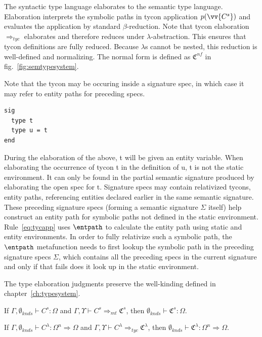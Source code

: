 The syntactic type language elaborates to the semantic type language. Elaboration interprets the symbolic paths in tycon application $p(\vv{C^s})$ and evaluates the application by standard $\beta$-reduction. Note that tycon elaboration $\Rightarrow_{tyc }$ elaborates and therefore reduces under $\lambda$-abstraction. This ensures that tycon definitions are fully reduced. Because $\lambda$s cannot be nested, this reduction is well-defined and normalizing. The normal form is defined as $\mathfrak{C}^{nf}$ in fig.~\ref{fig:semtypesystem}. 

 

Note that the tycon may be occuring inside a signature spec, in which case it may refer to entity paths for preceding specs. 

\begin{lstlisting}
sig 
  type t
  type u = t
end
\end{lstlisting}

During the elaboration of the above, t will be given an entity variable. When elaborating the occurrence of tycon t in the definition of u, t is not the static environment. It can only be found in the partial semantic signature produced by elaborating the open spec for t. Signature specs may contain relativized tycons, entity paths,
referencing entities declared earlier in the same semantic signature. These preceding signature specs (forming a semantic signature $\Sigma$ itself)
help construct an entity path for symbolic paths not defined in the
static environment. Rule~\ref{eq:tycapp} uses $\entpath$ to calculate the entity path using static and entity environments. In order
to fully relativize such a symbolic path, the $\entpath$ metafunction
needs to first lookup the symbolic path in the preceding signature
specs $\Sigma$, which contains all the preceding specs in the current signature and only if that fails does it look up in the static environment.  


The type elaboration judgments preserve the well-kinding defined in chapter~\ref{ch:typesystem}.

\begin{lemma}
If $\Gamma,\emptyset_{knds}\vdash C^s : \Omega$ and $\Gamma,\Upsilon\vdash C^s \Rightarrow_{mt} \mathfrak{C}^s$, then $\emptyset_{knds}\vdash \mathfrak{C}^s : \Omega$. 
\end{lemma}

\begin{lemma}
If $\Gamma,\emptyset_{knds}\vdash C^\lambda : \Omega^n \Rightarrow
\Omega$ and $\Gamma,\Upsilon\vdash C^\lambda \Rightarrow_{tyc}
\mathfrak{C}^\lambda$, then $\emptyset_{knds}\vdash \mathfrak{C}^\lambda : \Omega^n \Rightarrow \Omega$.
\end{lemma}

